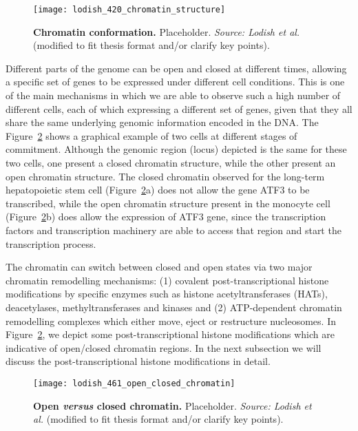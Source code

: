 \begin{figure}[h!]
\centering
\texttt{[image: lodish\_420\_chromatin\_structure]}
\caption[Chromatin conformation]{\textbf{Chromatin conformation.} Placeholder. \emph{Source: Lodish et al.}\cite{lodish2007} (modified to fit thesis format and/or clarify key points).}
\label{fig:lodish_chromatin_structure}
\end{figure}

Different parts of the genome can be open and closed at different times, allowing a specific set of genes to be expressed under different cell conditions. This is one of the main mechanisms in which we are able to observe such a high number of different cells, each of which expressing a different set of genes, given that they all share the same underlying genomic information encoded in the DNA. The Figure~\ref{fig:lodish_open_closed_chromatin} shows a graphical example of two cells at different stages of commitment. Although the genomic region (locus) depicted is the same for these two cells, one present a closed chromatin structure, while the other present an open chromatin structure. The closed chromatin observed for the long-term hepatopoietic stem cell (Figure~\ref{fig:lodish_open_closed_chromatin}a) does not allow the gene ATF3 to be transcribed, while the open chromatin structure present in the monocyte cell (Figure~\ref{fig:lodish_open_closed_chromatin}b) does allow the expression of ATF3 gene, since the transcription factors and transcription machinery are able to access that region and start the transcription process.

The chromatin can switch between closed and open states via two major chromatin remodelling mechanisms: (1) covalent post-transcriptional histone modifications by specific enzymes such as histone acetyltransferases (HATs), deacetylases, methyltransferases and kinases and (2) ATP-dependent chromatin remodelling complexes which either move, eject or restructure nucleosomes. In Figure~\ref{fig:lodish_open_closed_chromatin}, we depict some post-transcriptional histone modifications which are indicative of open/closed chromatin regions. In the next subsection we will discuss the post-transcriptional histone modifications in detail.

\begin{figure}[h!]
\centering
\texttt{[image: lodish\_461\_open\_closed\_chromatin]}
\caption[Open \emph{versus} closed chromatin]{\textbf{Open \emph{versus} closed chromatin.} Placeholder. \emph{Source: Lodish et al.}\cite{lodish2007} (modified to fit thesis format and/or clarify key points).}
\label{fig:lodish_open_closed_chromatin}
\end{figure}

